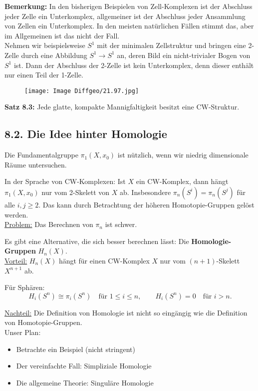 \documentclass[fleqn, 12pt, letterpaper]{article}
\begin{document}
\textbf{Bemerkung:} In den bisherigen Beispielen von Zell-Komplexen ist der Abschluss jeder Zelle ein Unterkomplex, 
allgemeiner ist der Abschluss jeder Ansammlung von Zellen ein Unterkomplex. In den meisten natürlichen Fällen stimmt das, 
aber im Allgemeinen ist das nicht der Fall.\\

Nehmen wir beispielsweise \( S^1 \) mit der minimalen Zellstruktur und bringen eine 2-Zelle durch eine Abbildung \( S^1 \to S^1 \) an, 
deren Bild ein nicht-trivialer Bogen von \( S^1 \) ist. Dann der Abschluss der 2-Zelle ist kein Unterkomplex, denn 
dieser enthält nur einen Teil der 1-Zelle.
\begin{figure}[H]
    \centering
    \texttt{[image: Image Diffgeo/21.97.jpg]}
 \end{figure}

\textbf{Satz 8.3:} Jede glatte, kompakte Mannigfaltigkeit besitzt eine CW-Struktur.

\subsection{8.2. Die Idee hinter Homologie}

Die Fundamentalgruppe \(\pi_1(X,x_0)\) ist nützlich, wenn wir niedrig dimensionale Räume untersuchen.

In der Sprache von CW-Komplexen: Ist \(X\) ein CW-Komplex, dann hängt \(\pi_1(X,x_0)\) nur vom 2-Skelett von \(X\) ab. Insbesondere \(\pi_n(S^i) = \pi_n(S^j)\) für alle \(i, j \geq 2\). Das kann durch Betrachtung der höheren Homotopie-Gruppen gelöst werden.\\

\underline{Problem:} Das Berechnen von \(\pi_n\) ist schwer.

Es gibt eine Alternative, die sich besser berechnen lässt: Die \textbf{Homologie-Gruppen} \(H_n(X)\).\\

\underline{Vorteil:} \(H_n(X)\) hängt für einen CW-Komplex \(X\) nur vom \((n+1)\)-Skelett \(X^{n+1}\) ab.

Für Sphären: 
\[
H_i(S^n) \cong \pi_i(S^n) \quad \text{für } 1 \leq i \leq n, 
\qquad 
H_i(S^n) = 0 \quad \text{für } i > n.
\]

\underline{Nachteil:} Die Definition von Homologie ist nicht so eingängig wie die Definition von Homotopie-Gruppen.\\

{Unser Plan:}
\begin{itemize}
    \item Betrachte ein Beispiel (nicht stringent)
    \item Der vereinfachte Fall: Simpliziale Homologie
    \item Die allgemeine Theorie: Singuläre Homologie
\end{itemize}
\end{document}
